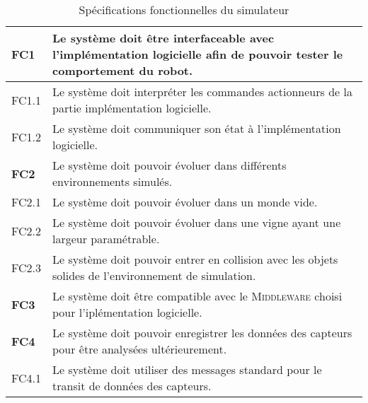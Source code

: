 \begin{table}[!htb]
\begin{adjustbox}{max width=\textwidth}
\begin{tabularx}{\textwidth}{|lX|}
                    \hline \hline
            
                    \cellcolor{orange!40}\textbf{FC1} &\cellcolor{orange!30} Le système doit être interfaceable avec l'implémentation logicielle afin de pouvoir tester le comportement du robot. \\
                    \hline
                    \cellcolor{gray!10}FC1.1& Le système doit interpréter les commandes actionneurs de la partie implémentation logicielle. \\
                    \hline
                    \cellcolor{gray!10}FC1.2& Le système doit communiquer son état à l'implémentation logicielle.\\
                    \hline
            
                    \hline \hline
            
                    \cellcolor{orange!40}\textbf{FC2}&\cellcolor{orange!30} Le système doit pouvoir évoluer dans différents environnements simulés. \\
                    \hline
                    \cellcolor{gray!10}FC2.1& Le système doit pouvoir évoluer dans un monde vide. \\
                    \hline
                    \cellcolor{gray!10}FC2.2& Le système doit pouvoir évoluer dans une vigne ayant une largeur paramétrable. \\
                    \hline
                    \cellcolor{gray!10}FC2.3& Le système doit pouvoir entrer en collision avec les objets solides de l'environnement de simulation. \\
            
                    \hline \hline
            
                    \cellcolor{orange!40}\textbf{FC3}&\cellcolor{orange!30} Le système doit être compatible avec le \textsc{Middleware} choisi pour l'iplémentation logicielle. \\
                    \hline
            
                    \hline \hline
            
                    \cellcolor{orange!40}\textbf{FC4}&\cellcolor{orange!30} Le système doit pouvoir enregistrer les données des capteurs pour être analysées ultérieurement. \\
                    \hline
                    \cellcolor{gray!10}FC4.1& Le système doit utiliser des messages standard pour le transit de données des capteurs. \\
                    \hline
                \end{tabularx}
            \end{adjustbox}
            \caption{Spécifications fonctionnelles du simulateur}
            \label{table:specs}
        \end{table}    

